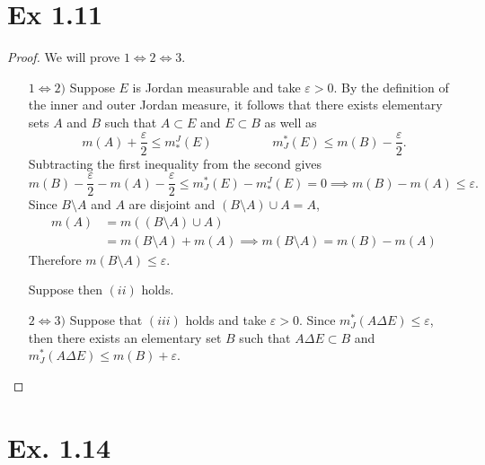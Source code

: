 \documentclass{eeleyes}
\newcommand\eps{\varepsilon}
\begin{document}
\section*{Ex 1.11}

\begin{proof}
    We will prove $1 \Leftrightarrow 2 \Leftrightarrow 3$. \hfill
    \begin{enumerate}
        \item[$1 \Leftrightarrow 2)$]
            Suppose $E$ is Jordan measurable and take $\eps > 0$. By the definition of the inner and outer Jordan measure, it follows that there exists elementary sets $A$ and $B$ such that $A \subset E$ and $E \subset B$ as well as
            \[
                m(A) + \frac{\eps}{2} \leq m_*^J(E) \hspace{2cm} m_J^*(E) \leq m(B) - \frac{\eps}{2}
            .\]
            Subtracting the first inequality from the second gives
            \[
                m(B) - \frac{\eps}{2} - m(A) - \frac{\eps}{2} \leq m_J^*(E) - m^J_*(E) = 0 \implies m(B) - m(A) \leq \eps
            .\]
            Since $B \setminus A$ and $A$ are disjoint and $(B \setminus A) \cup A = A$,
            \begin{align*}
                m(A) &= m((B \setminus A) \cup A) \\ 
                     &= m(B \setminus A) + m(A) \implies m(B \setminus A) = m(B) - m(A)
            \end{align*}
            Therefore $m(B \setminus A) \leq \eps$.

            Suppose then $(ii)$ holds.
        \item[$2 \Leftrightarrow 3)$]
            Suppose that $(iii)$ holds and take $\eps > 0$. Since $m_J^*(A \Delta E) \leq \eps$, then there exists an elementary set $B$ such that $A \Delta E \subset B$ and $m_J^*(A \Delta E) \leq m(B) + \eps$.
    \end{enumerate}
\end{proof}

\section*{Ex. 1.14}
\end{document}
